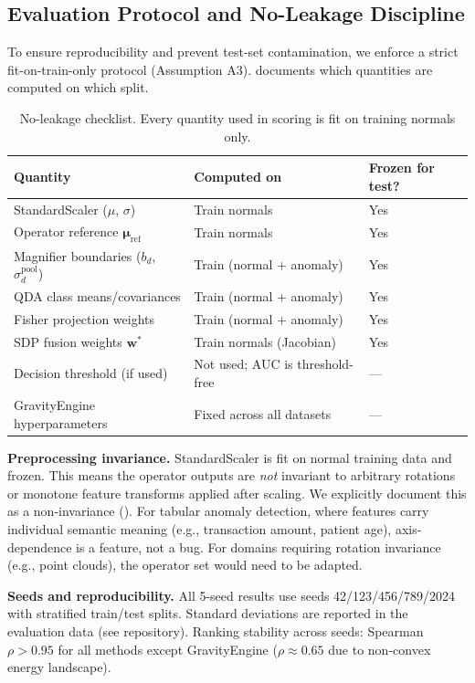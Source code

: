 \documentclass{article}
\begin{document}
\subsection{Evaluation Protocol and No-Leakage Discipline}
\label{ssec:protocol}

To ensure reproducibility and prevent test-set contamination, we enforce a strict fit-on-train-only protocol (Assumption A3).  documents which quantities are computed on which split.

\begin{table}[t]
\centering
\caption{No-leakage checklist. Every quantity used in scoring is fit on training normals only.}
\label{tab:noleak}
\begin{tabular}{@{}lll@{}}
\toprule
\textbf{Quantity} & \textbf{Computed on} & \textbf{Frozen for test?} \\
\midrule
StandardScaler ($\mu$, $\sigma$) & Train normals & Yes \\
Operator reference $\bm{\mu}_{\text{ref}}$ & Train normals & Yes \\
Magnifier boundaries ($b_d$, $\sigma_d^{\text{pool}}$) & Train (normal + anomaly) & Yes \\
QDA class means/covariances & Train (normal + anomaly) & Yes \\
Fisher projection weights & Train (normal + anomaly) & Yes \\
SDP fusion weights $\mathbf{w}^*$ & Train normals (Jacobian) & Yes \\
Decision threshold (if used) & Not used; AUC is threshold-free & --- \\
GravityEngine hyperparameters & Fixed across all datasets & --- \\
\bottomrule
\end{tabular}
\end{table}

\textbf{Preprocessing invariance.} StandardScaler is fit on normal training data and frozen. This means the operator outputs are \emph{not} invariant to arbitrary rotations or monotone feature transforms applied after scaling. We explicitly document this as a non-invariance (). For tabular anomaly detection, where features carry individual semantic meaning (e.g., transaction amount, patient age), axis-dependence is a feature, not a bug. For domains requiring rotation invariance (e.g., point clouds), the operator set would need to be adapted.

\textbf{Seeds and reproducibility.} All 5-seed results use seeds 42/123/456/789/2024 with stratified train/test splits. Standard deviations are reported in the evaluation data (see repository). Ranking stability across seeds: Spearman $\rho > 0.95$ for all methods except GravityEngine ($\rho \approx 0.65$ due to non-convex energy landscape).
\end{document}
